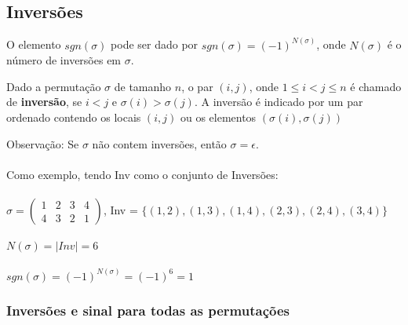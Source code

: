 \documentclass[12pt, a4paper]{article}
\begin{document}
\subsection{Inversões}

O elemento $sgn(\sigma)$ pode ser dado por $sgn(\sigma) = (-1)^{N(\sigma)}$, onde $N(\sigma)$ é o número de inversões em $\sigma$.

\par Dado a permutação $\sigma$ de tamanho $n$, o par $(i, j)$, onde $1 \leq i < j \leq n$ é chamado de \textbf{inversão}, se $i<j$ e $\sigma(i) > \sigma(j)$. A inversão é indicado por um par ordenado contendo os locais $(i, j)$ ou os elementos $(\sigma(i), \sigma(j))$
\par Observação: Se $\sigma$ não contem inversões, então $\sigma = \epsilon$.
\\ \\
Como exemplo, tendo Inv como o conjunto de Inversões: \\\\
$\sigma =\left(\begin{array}{cccc} 1 & 2 & 3 & 4\\ 4 & 3 & 2 & 1 \end{array}\right)$, Inv = $\{(1, 2), (1, 3), (1, 4), (2, 3), (2, 4), (3, 4)\}$
\\\\
$N(\sigma) = |Inv| = 6$
\\\\
$sgn(\sigma) = (-1)^{N(\sigma)} = (-1)^6 = 1$
\subsubsection{Inversões e sinal para todas as permutações}
\end{document}
